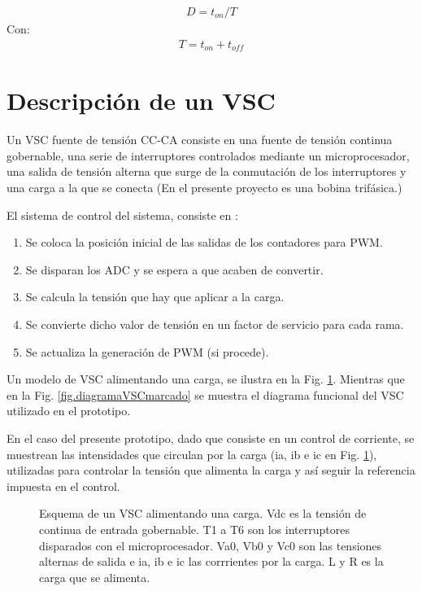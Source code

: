 \documentclass{report}
\begin{document}
    \begin{eqnarray}
    D = t_{on} / T \label{eq.factordeservicio}
    \end{eqnarray} 
    Con:
    \begin{eqnarray}
    T = t_{on} + t_{off} 
    \label{eq.definiciondeperiodo}
    \end{eqnarray}



\section{Descripción de un VSC} 

Un VSC fuente de tensión CC-CA consiste en una fuente de tensión continua gobernable, una serie de interruptores controlados mediante un microprocesador, una salida de tensión alterna que surge de la conmutación de los interruptores y una carga a la que se conecta (En el presente proyecto es una bobina trifásica.) 

El sistema de control del sistema, consiste en \cite{treintayuno}: 
\begin{enumerate}
    \item Se coloca la posición inicial de las salidas de los contadores para PWM.
    \item Se disparan los ADC y se espera a que acaben de convertir.
    \item Se calcula la tensión que hay que aplicar a la carga.
    \item Se convierte dicho valor de tensión en un factor de servicio para cada rama.
    \item Se actualiza la generación de PWM (si procede).
\end{enumerate} 

 Un modelo de VSC alimentando una carga, se ilustra en la Fig. \ref{fig.inversortrifasicoesquematicofiltroRL_2}.  Mientras que en la Fig. \ref{fig.diagramaVSCmarcado} se muestra el diagrama funcional del VSC utilizado en el prototipo.

En el caso del presente prototipo, dado que consiste en un control de corriente, se muestrean las intensidades que circulan por la carga (ia, ib e ic en Fig. \ref{fig.inversortrifasicoesquematicofiltroRL_2}), utilizadas para controlar la tensión que alimenta la carga y así seguir la referencia impuesta en el control. 


\begin{figure}[!h]
    \begin{center}
    \end{center}
    \caption{Esquema de un VSC alimentando una carga. Vdc es la tensión de continua de entrada gobernable. T1 a T6 son los interruptores disparados con el microprocesador. Va0, Vb0 y Vc0 son las tensiones alternas de salida e ia, ib e ic las corrrientes por la carga. L y R es la carga que se alimenta.}
    \label{fig.inversortrifasicoesquematicofiltroRL_2}
    \end{figure}
\end{document}
